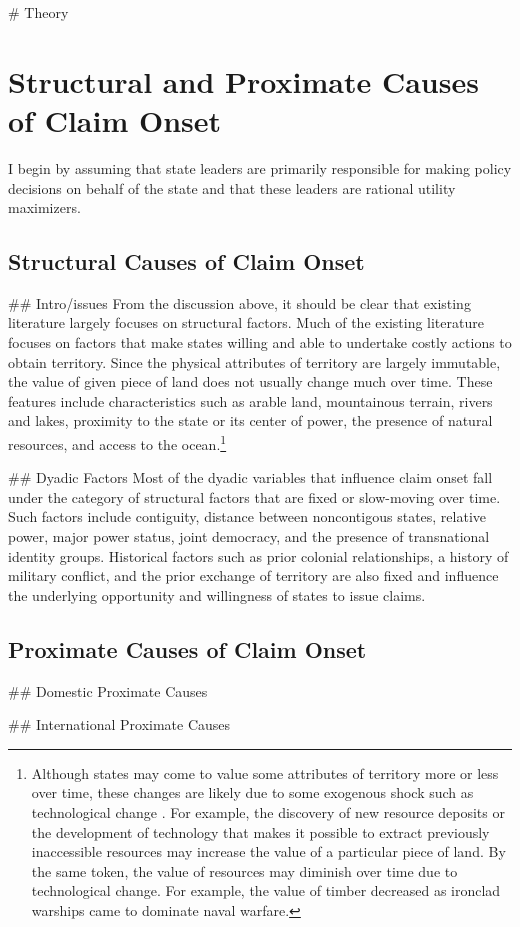# Theory
\section{Structural and Proximate Causes of Claim Onset}
I begin by assuming that state leaders are primarily responsible for making policy decisions on behalf of the state and that these leaders are rational utility maximizers. 


\subsection{Structural Causes of Claim Onset}

## Intro/issues
From the discussion above, it should be clear that existing literature largely focuses on structural factors. Much of the existing literature focuses on factors that make states willing and able to undertake costly actions to obtain territory. Since the physical attributes of territory are largely immutable, the value of given piece of land does not usually change much over time. These features include characteristics such as arable land, mountainous terrain, rivers and lakes, proximity to the state or its center of power, the presence of natural resources, and access to the ocean.\footnote{Although states may come to value some attributes of territory more or less over time, these changes are likely due to some exogenous shock such as technological change \citep[e.g.,][]{mansbach1981}. For example, the discovery of new resource deposits or the development of technology that makes it possible to extract previously inaccessible resources may increase the value of a particular piece of land. By the same token, the value of resources may diminish over time due to technological change. For example, the value of timber decreased as ironclad warships came to dominate naval warfare.}

## Dyadic Factors
Most of the dyadic variables that influence claim onset fall under the category of structural factors that are fixed or slow-moving over time. Such factors include contiguity, distance between noncontigous states, relative power, major power status, joint democracy, and the presence of transnational identity groups. Historical factors such as prior colonial relationships, a history of military conflict, and the prior exchange of territory are also fixed and influence the underlying opportunity and willingness of states to issue claims.



\subsection{Proximate Causes of Claim Onset}

## Domestic Proximate Causes


## International Proximate Causes

